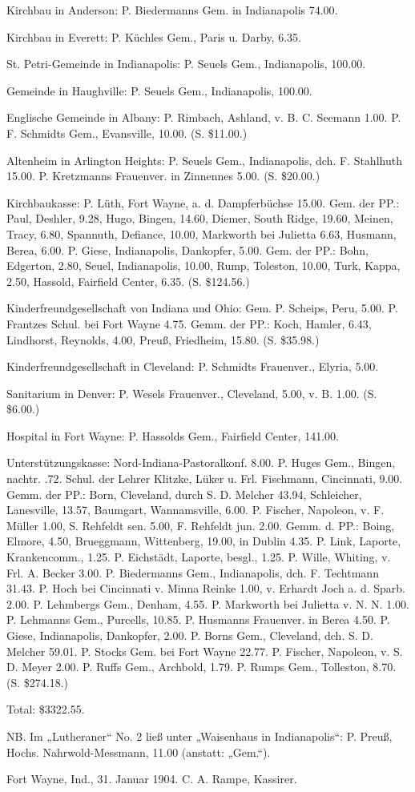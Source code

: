 Kirchbau in Anderson: P. Biedermanns Gem. in Indianapolis 74.00.

Kirchbau in Everett: P. Küchles Gem., Paris u. Darby, 6.35.

St. Petri-Gemeinde in Indianapolis: P. Seuels Gem., Indianapolis, 100.00.

Gemeinde in Haughville: P. Seuels Gem., Indianapolis, 100.00.

Englische Gemeinde in Albany: P. Rimbach, Ashland, v. B. C. Seemann 1.00. P. F. Schmidts Gem., Evansville, 10.00. (S. \$11.00.)

Altenheim in Arlington Heights: P. Seuels Gem., Indianapolis, dch. F. Stahlhuth 15.00. P. Kretzmanns Frauenver. in Zinnennes 5.00. (S. \$20.00.)

Kirchbaukasse: P. Lüth, Fort Wayne, a. d. Dampferbüchse 15.00. Gem. der PP.: Paul, Deshler, 9.28, Hugo, Bingen, 14.60, Diemer, South Ridge, 19.60, Meinen, Tracy, 6.80, Spannuth, Defiance, 10.00, Markworth bei Julietta 6.63, Husmann, Berea, 6.00. P. Giese, Indianapolis, Dankopfer, 5.00. Gem. der PP.: Bohn, Edgerton, 2.80, Seuel, Indianapolis, 10.00, Rump, Toleston, 10.00, Turk, Kappa, 2.50, Hassold, Fairfield Center, 6.35. (S. \$124.56.)

Kinderfreundgesellschaft von Indiana und Ohio: Gem. P. Scheips, Peru, 5.00. P. Frantzes Schul. bei Fort Wayne 4.75. Gemm. der PP.: Koch, Hamler, 6.43, Lindhorst, Reynolds, 4.00, Preuß, Friedheim, 15.80. (S. \$35.98.)

Kinderfreundgesellschaft in Cleveland: P. Schmidts Frauenver., Elyria, 5.00.

Sanitarium in Denver: P. Wesels Frauenver., Cleveland, 5.00, v. B. 1.00. (S. \$6.00.)

Hospital in Fort Wayne: P. Hassolds Gem., Fairfield Center, 141.00.

Unterstützungskasse: Nord-Indiana-Pastoralkonf. 8.00. P. Huges Gem., Bingen, nachtr. .72. Schul. der Lehrer Klitzke, Lüker u. Frl. Fischmann, Cincinnati, 9.00. Gemm. der PP.: Born, Cleveland, durch S. D. Melcher 43.94, Schleicher, Lanesville, 13.57, Baumgart, Wannamsville, 6.00. P. Fischer, Napoleon, v. F. Müller 1.00, S. Rehfeldt sen. 5.00, F. Rehfeldt jun. 2.00. Gemm. d. PP.: Boing, Elmore, 4.50, Brueggmann, Wittenberg, 19.00, in Dublin 4.35. P. Link, Laporte, Krankencomm., 1.25. P. Eichstädt, Laporte, besgl., 1.25. P. Wille, Whiting, v. Frl. A. Becker 3.00. P. Biedermanns Gem., Indianapolis, dch. F. Techtmann 31.43. P. Hoch bei Cincinnati v. Minna Reinke 1.00, v. Erhardt Joch a. d. Sparb. 2.00. P. Lehmbergs Gem., Denham, 4.55. P. Markworth bei Julietta v. N. N. 1.00. P. Lehmanns Gem., Purcells, 10.85. P. Husmanns Frauenver. in Berea 4.50. P. Giese, Indianapolis, Dankopfer, 2.00. P. Borns Gem., Cleveland, dch. S. D. Melcher 59.01. P. Stocks Gem. bei Fort Wayne 22.77. P. Fischer, Napoleon, v. S. D. Meyer 2.00. P. Ruffs Gem., Archbold, 1.79. P. Rumps Gem., Tolleston, 8.70. (S. \$274.18.)

Total: \$3322.55.

NB. Im „Lutheraner“ No. 2 ließ unter „Waisenhaus in Indianapolis“: P. Preuß, Hochs. Nahrwold-Messmann, 11.00 (anstatt: „Gem.“).

Fort Wayne, Ind., 31. Januar 1904. C. A. Rampe, Kassirer.
